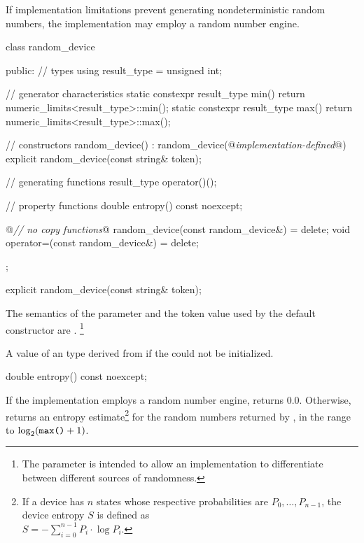 \pnum
If implementation limitations%
prevent generating nondeterministic random numbers,
the implementation may employ a random number engine.

%
%
\begin{codeblock}
class random_device {
public:
  // types
  using result_type = unsigned int;

  // generator characteristics
  static constexpr result_type min() { return numeric_limits<result_type>::min(); }
  static constexpr result_type max() { return numeric_limits<result_type>::max(); }

  // constructors
  random_device() : random_device(@\textit{implementation-defined}@) {}
  explicit random_device(const string& token);

  // generating functions
  result_type operator()();

  // property functions
  double entropy() const noexcept;

  @\textit{// no copy functions}@
  random_device(const random_device&) = delete;
  void operator=(const random_device&) = delete;
};
\end{codeblock}


%
\begin{itemdecl}
explicit random_device(const string& token);
\end{itemdecl}

\begin{itemdescr}
\pnum
\remarks
 The semantics of the  parameter
 and the token value used by the default constructor are
 .%
\footnote{The parameter is intended
   to allow an implementation to differentiate
   between different sources of randomness.}

\pnum
\throws
A value of an  type
 derived from 
 if the  could not be initialized.
\end{itemdescr}

%
\begin{itemdecl}
double entropy() const noexcept;
\end{itemdecl}

\begin{itemdescr}
\pnum
\returns
If the implementation employs a random number engine,
 returns $0.0$.
 Otherwise, returns an entropy estimate\footnote{If a device has $n$ states
   whose respective probabilities are
   $P_0, \dotsc, P_{n-1}$,
   the device entropy $S$ is defined as\\
   $S = - \sum_{i=0}^{n-1} P_i \cdot \log P_i$.}
 for the random numbers returned by ,
 in the range
 to
   $\log_2( \texttt{max()}+1)$.
\end{itemdescr}

